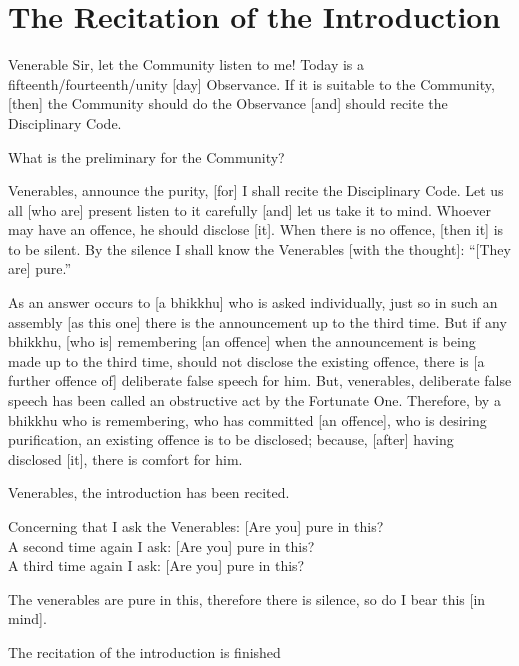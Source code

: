
\section{The Recitation of the Introduction}
\label{introduction}

Venerable Sir, let the Community listen to me! Today is a fifteenth/fourteenth/unity [day] Observance. If it is suitable to the Community, [then] the Community should do the Observance [and] should recite the Disciplinary Code.

What is the preliminary for the Community?

Venerables, announce the purity, [for] I shall recite the Disciplinary Code. Let us all [who are] present listen to it carefully [and] let us take it to mind. Whoever may have an offence, he should disclose [it]. When there is no offence, [then it] is to be silent. By the silence I shall know the Venerables [with the thought]: ``[They are] pure.''

As an answer occurs to [a bhikkhu] who is asked individually, just so in such an assembly [as this one] there is the announcement up to the third time. But if any bhikkhu, [who is] remembering [an offence] when the announcement is being made up to the third time, should not disclose the existing offence, there is [a further offence of] deliberate false speech for him. But, venerables, deliberate false speech has been called an obstructive act by the Fortunate One. Therefore, by a bhikkhu who is remembering, who has committed [an offence], who is desiring purification, an existing offence is to be disclosed; because, [after] having disclosed [it], there is comfort for him.

\medskip

\begin{center}
	Venerables, the introduction has been recited.

	\smallskip

	Concerning that I ask the Venerables: [Are you] pure in this?\\
	A second time again I ask: [Are you] pure in this?\\
	A third time again I ask: [Are you] pure in this?

	\smallskip

	The venerables are pure in this, therefore there is silence, so do I bear this [in mind].
\end{center}

\begin{outro}
	The recitation of the introduction is finished
\end{outro}

\clearpage

